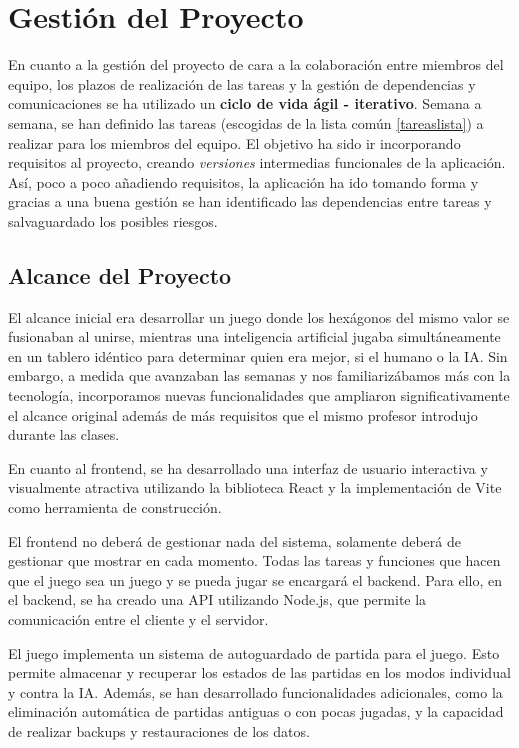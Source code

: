 \documentclass[12pt,epsf,titlepage,a4paper]{article}
\begin{document}
\pagebreak

\section{Gestión del Proyecto}

En cuanto a la gestión del proyecto de cara a la colaboración entre miembros del equipo, los plazos de realización de las tareas y la gestión de dependencias y comunicaciones se ha utilizado un \textbf{ciclo de vida ágil - iterativo}.
Semana a semana, se han definido las tareas (escogidas de la lista común \ref{tareaslista}) a realizar para los miembros del equipo. El objetivo ha sido ir incorporando requisitos al proyecto, creando \emph{versiones} intermedias funcionales de la aplicación. Así, poco a poco añadiendo requisitos, la aplicación ha ido tomando forma y gracias a una buena gestión se han identificado las dependencias entre tareas y salvaguardado los posibles riesgos.

\subsection{Alcance del Proyecto}
El alcance inicial era desarrollar un juego donde los hexágonos del mismo valor se fusionaban al unirse, mientras una inteligencia artificial jugaba simultáneamente en un tablero idéntico para determinar quien era mejor, si el humano o la IA. Sin embargo, a medida que avanzaban las semanas y nos familiarizábamos más con la tecnología, incorporamos nuevas funcionalidades que ampliaron significativamente el alcance original además de más requisitos que el mismo profesor introdujo durante las clases.

En cuanto al frontend, se ha desarrollado una interfaz de usuario interactiva y visualmente atractiva utilizando la biblioteca React y la implementación de Vite como herramienta de construcción. 

El frontend no deberá de gestionar nada del sistema, solamente deberá de gestionar que mostrar en cada momento. Todas las tareas y funciones que hacen que el juego sea un juego y se pueda jugar se encargará el backend. Para ello, en el backend, se ha creado una API utilizando Node.js, que permite la comunicación entre el cliente y el servidor.

El juego implementa un sistema de autoguardado de partida para el juego. Esto permite almacenar y recuperar los estados de las partidas en los modos individual y contra la IA. Además, se han desarrollado funcionalidades adicionales, como la eliminación automática de partidas antiguas o con pocas jugadas, y la capacidad de realizar backups y restauraciones de los datos.
\end{document}
